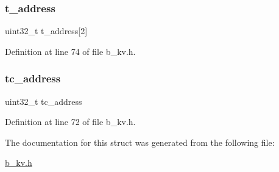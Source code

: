 \subsubsection{\texorpdfstring{t\+\_\+address}{t\_address}}
{\footnotesize\ttfamily uint32\+\_\+t t\+\_\+address\mbox{[}2\mbox{]}}



Definition at line 74 of file b\+\_\+kv.\+h.

\mbox{\label{structb_k_v___info__t_a8b5d1cee52dce06629197fc8c5772a98}} 
\subsubsection{\texorpdfstring{tc\+\_\+address}{tc\_address}}
{\footnotesize\ttfamily uint32\+\_\+t tc\+\_\+address}



Definition at line 72 of file b\+\_\+kv.\+h.



The documentation for this struct was generated from the following file\+:\begin{DoxyCompactItemize}
\item 
\mbox{\hyperlink{b__kv_8h}{b\+\_\+kv.\+h}}\end{DoxyCompactItemize}
